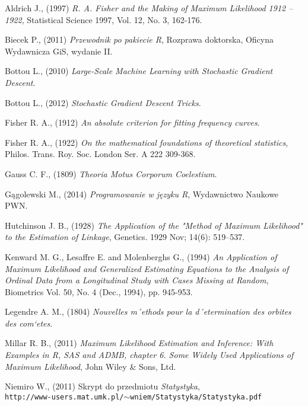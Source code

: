 \begin{thebibliography}{99}

 Aldrich J., (1997) \textit{R. A. Fisher and the Making of Maximum Likelihood 1912 – 1922}, Statistical Science
1997, Vol. 12, No. 3, 162-176.

 Biecek P., (2011) \textit{Przewodnik po pakiecie R}, Rozprawa doktorska, Oficyna Wydawnicza GiS, wydanie II.

 Bottou L., (2010) \textit{Large-Scale Machine Learning with Stochastic Gradient Descent}.

 Bottou L., (2012) \textit{Stochastic Gradient Descent Tricks}.

 Fisher R. A., (1912) \textit{An absolute criterion for fitting frequency curves}. 

 Fisher R. A., (1922) \textit{On the mathematical foundations of theoretical statistics}, Philos. Trans. Roy. Soc. London Ser. A 222 309-368.


 Gauss C. F., (1809) \textit{Theoria Motus Corporum Coelestium}.

 Gągolewski M., (2014) \textit{Programowanie w języku R}, Wydawnictwo Naukowe PWN.


 Hutchinson J. B., (1928) \textit{The Application of the "Method of Maximum Likelihood" to the Estimation of Linkage}, Genetics. 1929 Nov; 14(6): 519–537.


 Kenward M. G., Lesaffre E. and Molenberghs G., (1994) \textit{An Application of Maximum Likelihood and Generalized Estimating Equations to the Analysis of Ordinal Data from a Longitudinal Study with Cases Missing at Random}, Biometrics
Vol. 50, No. 4 (Dec., 1994), pp. 945-953.

 Legendre A. M., (1804) \textit{Nouvelles m´ethods pour la d´etermination des orbites des com`etes}.

 Millar R. B., (2011) \textit{Maximum Likelihood Estimation and Inference: With Examples in R, SAS and ADMB, chapter 6. Some Widely Used Applications of Maximum Likelihood}, John Wiley \& Sons, Ltd.

 Niemiro W., (2011) Skrypt do przedmiotu \textit{Statystyka}, \\ \texttt{http://www-users.mat.umk.pl/$\sim$wniem/Statystyka/Statystyka.pdf}


\end{thebibliography}
